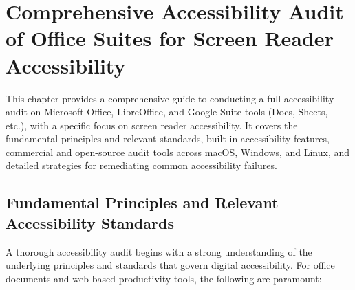 \chapter{Comprehensive Accessibility Audit of Office Suites for Screen Reader Accessibility}

This chapter provides a comprehensive guide to conducting a full accessibility audit on Microsoft Office, LibreOffice, and Google Suite tools (Docs, Sheets, etc.), with a specific focus on screen reader accessibility. It covers the fundamental principles and relevant standards, built-in accessibility features, commercial and open-source audit tools across macOS, Windows, and Linux, and detailed strategies for remediating common accessibility failures.

\section{Fundamental Principles and Relevant Accessibility Standards}

A thorough accessibility audit begins with a strong understanding of the underlying principles and standards that govern digital accessibility. For office documents and web-based productivity tools, the following are paramount:

